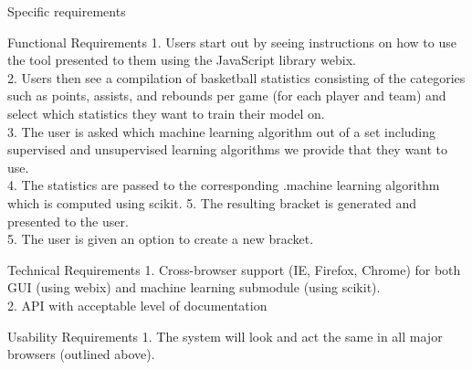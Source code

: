 \documentclass[letterpaper, 10pt,titlepage]{article}
\begin{document}
\begin{section}{Specific requirements}


\begin{subsection}{Functional Requirements}
1.	Users start out by seeing instructions on how to use the tool presented to them using the JavaScript library webix. \\
2.	Users then see a compilation of basketball statistics consisting of the categories such as points, assists, and rebounds per game (for each player and team) and select which statistics they want to train their model on. \\
3.   	The user is asked which machine learning algorithm out of a set including supervised and unsupervised learning algorithms we provide that they want to use. \\
4.      The statistics are passed to the corresponding .machine learning algorithm which is computed using scikit. 
5. 	The resulting bracket is generated and presented to the user. \\
5.      The user is given an option to create a new bracket. \\


\end{subsection}

\begin{subsection}{Technical Requirements}
1.       Cross-browser support (IE, Firefox, Chrome) for both GUI (using webix) and machine learning submodule (using scikit). \\
2.       API with acceptable level of documentation \\


\end{subsection}

\begin{subsection}{Usability Requirements}
1.       The system will look and act the same in all major browsers (outlined above). \\


\end{subsection}
\end{section}

\newpage
\end{document}
